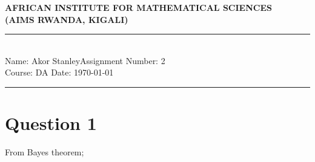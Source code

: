 \documentclass[12pt,a4paper]{article}
\newcommand{\student}{Akor Stanley}
\newcommand{\course}{DA }
\newcommand{\assignment}{2}
\begin{document}
\thispagestyle{empty}
\begin{center}
\textbf{AFRICAN INSTITUTE FOR MATHEMATICAL SCIENCES \\[0.5cm]
(AIMS RWANDA, KIGALI)}
\vspace{1.0cm}
\end{center}
\noindent
\rule{17cm}{0.2cm}\\[0.3cm]
Name: \student \hfill Assignment Number: \assignment\\[0.1cm]
Course: \course \hfill Date: \today\\
\rule{17cm}{0.05cm}
\vspace{1.0cm}
\section*{Question 1}
From Bayes theorem;
\end{document}
